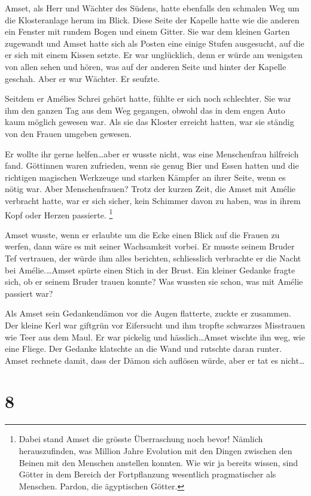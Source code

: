 \documentclass[11pt,titlepage,a5paper]{book}
\begin{document}
Amset, als Herr und Wächter des Südens, hatte ebenfalls den schmalen Weg um die Klosteranlage herum im Blick. Diese Seite der Kapelle hatte wie die anderen ein Fenster mit rundem Bogen und einem Gitter. Sie war dem kleinen Garten zugewandt und Amset hatte sich als Posten eine einige Stufen ausgesucht, auf die er sich mit einem Kissen setzte. Er war unglücklich, denn er würde am wenigsten von allen sehen und hören, was auf der anderen Seite und hinter der Kapelle geschah. Aber er war Wächter. Er seufzte.

Seitdem er Amélies Schrei gehört hatte, fühlte er sich noch schlechter. Sie war ihm den ganzen Tag aus dem Weg gegangen, obwohl das in dem engen Auto kaum möglich gewesen war. Als sie das Kloster erreicht hatten, war sie ständig von den Frauen umgeben gewesen. 

Er wollte ihr gerne helfen\dots aber er wusste nicht, was eine Menschenfrau hilfreich fand. Göttinnen waren zufrieden, wenn sie genug Bier und Essen hatten und die richtigen magischen Werkzeuge und starken Kämpfer an ihrer Seite, wenn es nötig war. Aber Menschenfrauen? Trotz der kurzen Zeit, die Amset mit Amélie verbracht hatte, war er sich sicher, kein Schimmer davon zu haben, was in ihrem Kopf oder Herzen passierte. \footnote{Dabei stand Amset die grösste Überraschung noch bevor! Nämlich herauszufinden, was Million Jahre Evolution mit den Dingen zwischen den Beinen mit den Menschen anstellen konnten. Wie wir ja bereits wissen, sind Götter in dem Bereich der Fortpflanzung wesentlich pragmatischer als Menschen. Pardon, die ägyptischen Götter.} 

 Amset wusste, wenn er erlaubte um die Ecke einen Blick auf die Frauen zu werfen, dann wäre es mit seiner Wachsamkeit vorbei. Er musste seinem Bruder Tef vertrauen, der würde ihm alles berichten, schliesslich verbrachte er die Nacht bei Amélie.\dots Amset spürte einen Stich in der Brust. Ein kleiner Gedanke fragte sich, ob er seinem Bruder trauen konnte? Was wussten sie schon, was mit Amélie passiert war?

Als Amset sein Gedankendämon vor die Augen flatterte, zuckte er zusammen. Der kleine Kerl war giftgrün vor Eifersucht und ihm  tropfte schwarzes Misstrauen wie Teer aus dem Maul. Er war pickelig und hässlich\dots Amset wischte ihn weg, wie  eine Fliege. Der Gedanke klatschte an die Wand und rutschte daran runter. Amset rechnete damit, dass der Dämon sich auflösen würde, aber er tat es nicht\dots

\section*{8}
\end{document}
